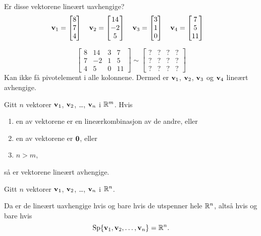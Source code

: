 \begin{ex}
Er disse vektorene lineært uavhengige?
\[
\mathbf{v}_1 = \begin{bmatrix} 8 \\ 7 \\ 4 \end{bmatrix}\quad
\mathbf{v}_2 = \begin{bmatrix} 14 \\ -2 \\ 5 \end{bmatrix}\quad
\mathbf{v}_3 = \begin{bmatrix} 3 \\ 1 \\ 0 \end{bmatrix}\quad
\mathbf{v}_4 = \begin{bmatrix} 7 \\ 5 \\ 11 \end{bmatrix}\quad
\]

\[
\begin{bmatrix}
8 & 14 & 3 & 7 \\
7 & -2 & 1 & 5 \\
4 & 5 & 0 & 11
\end{bmatrix}
\sim
\begin{bmatrix}
? & ? & ? & ? \\
? & ? & ? & ? \\
? & ? & ? & ?
\end{bmatrix}
\]
Kan ikke få pivotelement i alle kolonnene.  Dermed er
$\mathbf{v}_1$, $\mathbf{v}_2$, $\mathbf{v}_3$ og $\mathbf{v}_4$ lineært avhengige.
\end{ex}




\begin{thm}
\label{thm:linavhspan}
Gitt $n$ vektorer  $\mathbf{v}_1$, $\mathbf{v}_2$, \ldots, $\mathbf{v}_n$ i $\mathbb{R}^m$.  Hvis
\begin{enumerate}
\item en av vektorene er en lineærkombinasjon av de andre, eller
\item en av vektorene er $\mathbf{0}$, eller
\item $n > m$,
\end{enumerate}
så er vektorene lineært avhengige.
\end{thm}



\begin{thm}
\label{thm:linuavhspan}
Gitt $n$ vektorer $\mathbf{v}_1$, $\mathbf{v}_2$, \ldots, $\mathbf{v}_n$ i $\mathbb{R}^n$.

Da er de lineært uavhengige hvis og bare hvis de utspenner hele $\mathbb{R}^n$,
altså hvis og bare hvis
\[
\operatorname{Sp} \{ \mathbf{v}_1, \mathbf{v}_2, \ldots, \mathbf{v}_n \} = \mathbb{R}^n.
\]
\end{thm}




\kapittelslutt
